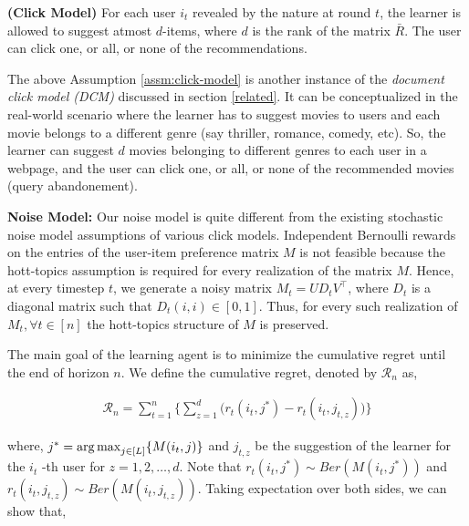 \begin{assumption}\textbf{(Click Model)}
\label{assm:click-model}
For each user $i_t$ revealed by the nature at round $t$, the learner is allowed to suggest atmost $d$-items, where $d$ is the rank of the matrix $\bar{R}$. The user can click one, or all, or none of the recommendations. 
\end{assumption}

\begin{discussion}
The above Assumption \ref{assm:click-model} is another instance of the \textit{document click model (DCM)} discussed in section \ref{related}. It can be conceptualized in the real-world scenario where the learner has  to suggest movies to users and each movie belongs to a different genre (say thriller, romance, comedy, etc). So, the learner can suggest $d$ movies belonging to different genres to each user in a webpage, and the user can click one, or all, or none of the recommended movies (query abandonement).
\end{discussion}

\textbf{Noise Model:} Our noise model is quite different from the existing stochastic noise model assumptions of various click models. Independent Bernoulli rewards on the entries of the user-item preference matrix $M$ is not feasible because the hott-topics assumption  is required for every realization of the matrix $M$. Hence,  at every timestep $t$, we generate a noisy matrix $M_t = UD_t V^{\intercal}$, where $D_t$ is a diagonal matrix such that $D_t(i,i)\in[0,1]$. Thus, for every such realization of $M_t, \forall t\in [n]$ the hott-topics structure of $M$ is preserved.

The main goal of the learning agent is to minimize the cumulative regret until the end of horizon $n$. We define the cumulative regret, denoted by $\mathcal{R}_n$ as,

\begin{align*}
\mathcal{R}_n = \sum_{t=1}^{n}\bigg\lbrace \sum_{z=1}^{d} \bigg( r_{t}\left(i_{t}, j^* \right) - r_{t}\left( i_{t}, j_{t,z}\right)\bigg)\bigg\rbrace
\end{align*}

where, $j^* = \mathop{\rm arg\,max}_{j\in [L]}\lbrace M(i_t,j)\rbrace$ and $j_{t,z}$ be the suggestion of the learner for the $i_t$ -th user for  $z=1,2,\ldots, d$. Note that $r_{t}\left(i_t, j^* \right)\sim Ber(M\left(i_t, j^*\right))$ and $r_{t}\left(i_t, j_{t,z} \right)\sim Ber(M\left(i_t, j_{t,z} \right))$. Taking expectation over both sides, we can show that,


